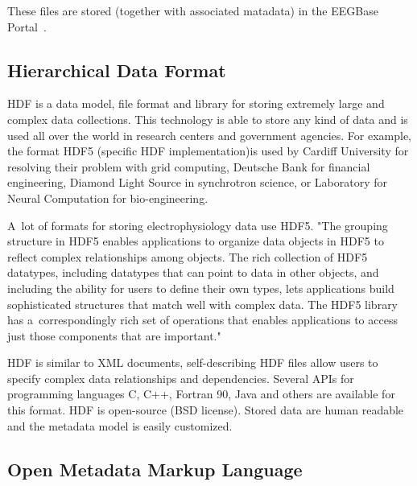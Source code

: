 \documentclass[conference]{IEEEtran}
\begin{document}
These files are stored (together with associated matadata) in the EEGBase Portal~\cite{eegportal}.

\subsection{Hierarchical Data Format}

HDF is a data model, file format and library for storing extremely large and complex data collections. This technology is able to store any kind of data and is used all over the world in research centers and government agencies. For example, the format HDF5 (specific HDF implementation)is used by Cardiff University for resolving their problem with grid computing, Deutsche Bank for financial engineering, Diamond Light Source in synchrotron science, or Laboratory for Neural Computation for bio-engineering. 

A~lot of formats for storing electrophysiology data use HDF5.
"The grouping structure in HDF5 enables applications to organize data objects in HDF5 to reflect complex relationships among objects. The rich collection of HDF5 datatypes, including datatypes that can point to data in other objects, and including the ability for users to define their own types, lets applications build sophisticated structures that match well with complex data. The HDF5 library has a~correspondingly rich set of operations that enables applications to access just those components that are important." \cite{hdf}


HDF is similar to XML documents, self-describing HDF files allow users to specify complex data relationships and dependencies. Several APIs for programming languages C, C++, Fortran 90, Java and others are available for this format. HDF is open-source (BSD license). Stored data are human readable and the metadata model is easily customized.

\subsection{Open Metadata Markup Language}
\label{odML}
\end{document}
